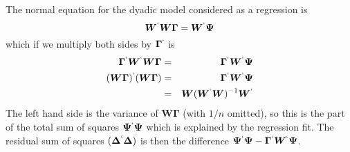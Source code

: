 \documentclass[titlepage]{article}  %
\begin{document}
The normal equation for the dyadic model considered as a regression is
\begin{displaymath}
\bm{W}^{`} \bm{W} \bm{\Gamma} = \bm{W}^{`} \bm{\Psi}
\end{displaymath}
which if we multiply both sides by $\bm{\Gamma}^{`}$ is
\begin{eqnarray*}
\bm{\Gamma}^{`} \bm{W}^{`} \bm{W} \bm{\Gamma} & = & \bm{\Gamma}^{`} \bm{W}^{`} \bm{\Psi} \\
(\bm{W}\bm{\Gamma})^{`} (\bm{W}\bm{\Gamma}) & = & \bm{\Gamma}^{`} \bm{W}^{`} \bm{\Psi} \\
 & = & \bm{W}(\bm{W}^{`}\bm{W})^{-1}\bm{W}^{`}
\end{eqnarray*}
The left hand side is the variance of $\bm{W}\bm{\Gamma}$ (with $1/n$ omitted), so this is the part of the total sum of squares $\bm{\Psi}^{`}\bm{\Psi}$ which is explained by the regression fit. The residual sum of squares $(\bm{\Delta}^{`} \bm{\Delta})$ is then the difference $\bm{\Psi}^{`}\bm{\Psi} - \bm{\Gamma}^{`} \bm{W}^{`} \bm{\Psi}$.
\end{document}
